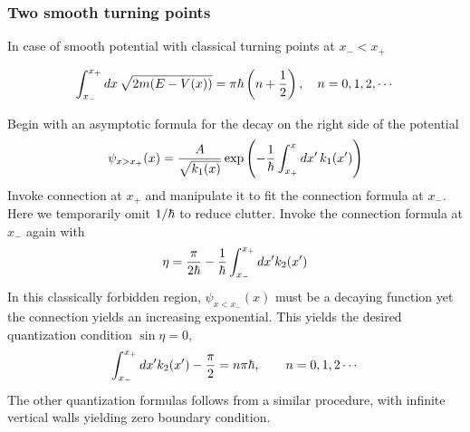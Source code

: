 \subsubsection{Two smooth turning points}
In case of smooth potential with classical turning points at $x_-<x_+$
\begin{mdframed}
    \[ 
        \int_{x_-}^{x_+} dx\, \sqrt{2m(E - V(x))} = \pi \hbar \left(n + \dfrac 1 2\right)
        ,\quad n = 0, 1, 2, \cdots 
    \]  
\end{mdframed}
Begin with an asymptotic formula for the decay on the right side of the potential 
\[ 
    \psi_{x>x_+}(x) = \dfrac{A}{\sqrt{k_1(x)}}\exp \left(-\dfrac 1 {\hbar} \int_{x_+}^x dx'\, k_1(x')\right)
\] 
Invoke connection at $x_+$ and manipulate it to fit the connection formula at $x_-$. 
Here we temporarily omit $1/\hbar$ to reduce clutter. 
Invoke the connection formula at $x_-$ again with 
\[ 
    \eta =  \frac{\pi}{2\hbar} - \dfrac 1 {\hbar} \int_{x_-}^{x_+}dx' k_2(x') 
\] 
In this classically forbidden region, $\psi_{x<x_-}(x)$ must be a decaying function yet 
the connection yields an increasing exponential. This yields the desired quantization 
condition $\sin\eta = 0$,  
\[ 
    \int_{x_-}^{x_+}dx' k_2(x') - \frac{\pi}{2} = n\pi \hbar, \quad\quad n=0, 1, 2\cdots
\] 
The other quantization formulas follows from a similar procedure, with infinite vertical 
walls yielding zero boundary condition. 


